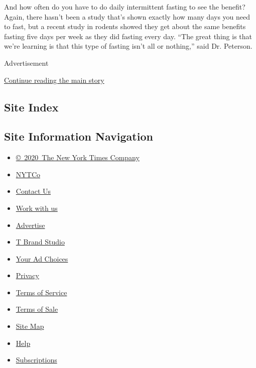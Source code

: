 And how often do you have to do daily intermittent fasting to see the
benefit? Again, there hasn't been a study that's shown exactly how many
days you need to fast, but a recent study in rodents showed they get
about the same benefits fasting five days per week as they did fasting
every day. ``The great thing is that we're learning is that this type of
fasting isn't all or nothing,'' said Dr. Peterson.

Advertisement

\protect\hyperlink{after-bottom}{Continue reading the main story}

\hypertarget{site-index}{%
\subsection{Site Index}\label{site-index}}

\hypertarget{site-information-navigation}{%
\subsection{Site Information
Navigation}\label{site-information-navigation}}

\begin{itemize}
\tightlist
\item
  \href{https://help.nytimes3xbfgragh.onion/hc/en-us/articles/115014792127-Copyright-notice}{©~2020~The
  New York Times Company}
\end{itemize}

\begin{itemize}
\tightlist
\item
  \href{https://www.nytco.com/}{NYTCo}
\item
  \href{https://help.nytimes3xbfgragh.onion/hc/en-us/articles/115015385887-Contact-Us}{Contact
  Us}
\item
  \href{https://www.nytco.com/careers/}{Work with us}
\item
  \href{https://nytmediakit.com/}{Advertise}
\item
  \href{http://www.tbrandstudio.com/}{T Brand Studio}
\item
  \href{https://www.nytimes3xbfgragh.onion/privacy/cookie-policy\#how-do-i-manage-trackers}{Your
  Ad Choices}
\item
  \href{https://www.nytimes3xbfgragh.onion/privacy}{Privacy}
\item
  \href{https://help.nytimes3xbfgragh.onion/hc/en-us/articles/115014893428-Terms-of-service}{Terms
  of Service}
\item
  \href{https://help.nytimes3xbfgragh.onion/hc/en-us/articles/115014893968-Terms-of-sale}{Terms
  of Sale}
\item
  \href{https://spiderbites.nytimes3xbfgragh.onion}{Site Map}
\item
  \href{https://help.nytimes3xbfgragh.onion/hc/en-us}{Help}
\item
  \href{https://www.nytimes3xbfgragh.onion/subscription?campaignId=37WXW}{Subscriptions}
\end{itemize}
